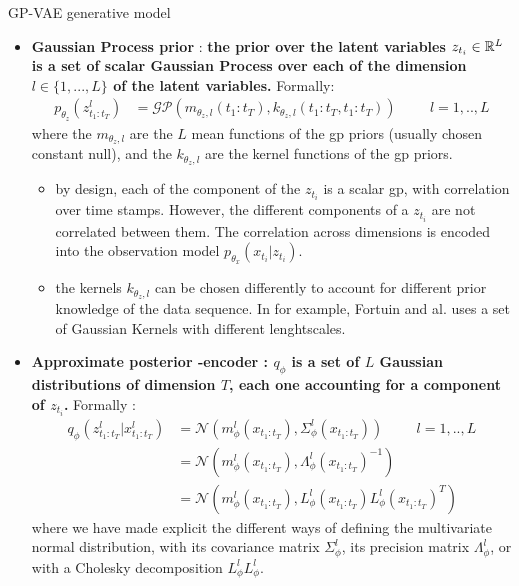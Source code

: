 \begin{frame}{GP-VAE generative model}
    \begin{itemize}
        \item \textbf{Gaussian Process prior} : \textbf{the prior over the latent variables $z_{t_i} \in \mathbb{R}^L$ is a set of scalar Gaussian Process over each of the dimension $l \in \{1,...,L\}$ of the latent variables.} Formally:
            \begin{align}
                p_{\theta_z}(z_{t_1:t_T}^l) &= \mathcal{GP}(m_{\theta_z, l}(t_1:t_T), k_{\theta_z, l}(t_1:t_T, t_1:t_T)) \hspace{1cm} l=1,..,L
            \end{align}
            where the $m_{\theta_z, l}$ are the $L$ mean functions of the \gls{gp} priors (usually chosen constant null), and the $k_{\theta_z, l}$ are the kernel functions of the \gls{gp} priors.
            \begin{itemize}
                \item by design, each of the component of the $z_{t_i}$ is a scalar \gls{gp}, with correlation over time stamps. However, the different components of a $z_{t_i}$ are not correlated between them. The correlation across dimensions is encoded into the observation model $p_{\theta_x}(x_{t_i} \vert z_{t_i})$.
                \item the kernels $k_{\theta_z, l}$ can be chosen differently to account for different prior knowledge of the data sequence. In \cite{fortuin_gp-vae:_2020} for example, Fortuin and al. uses a set of Gaussian Kernels with different lenghtscales.
            \end{itemize}
        \item \textbf{Approximate posterior -encoder : $q_\phi$ is a set of $L$ Gaussian distributions of dimension $T$, each one accounting for a component of $z_{t_i}$.} Formally :
            \begin{align}
                q_\phi(z_{t_1:t_T}^l \vert x_{t_1:t_T}^l) &= \mathcal{N}(m_{\phi}^l(x_{t_1:t_T}), \Sigma_{\phi}^l(x_{t_1:t_T})) \hspace{1cm} l=1,..,L \\
                &= \mathcal{N}(m_{\phi}^l(x_{t_1:t_T}), \Lambda_{\phi}^l(x_{t_1:t_T})^{-1}) \\
                &= \mathcal{N}(m_{\phi}^l(x_{t_1:t_T}), L_{\phi}^l(x_{t_1:t_T})L_{\phi}^l(x_{t_1:t_T})^T)
            \end{align}
            where we have made explicit the different ways of defining the multivariate normal distribution, with its covariance matrix $\Sigma_\phi^l$, its precision matrix $\Lambda_\phi^l$, or with a Cholesky decomposition $L_{\phi}^lL_{\phi}^l$.
    \end{itemize}
\end{frame}


